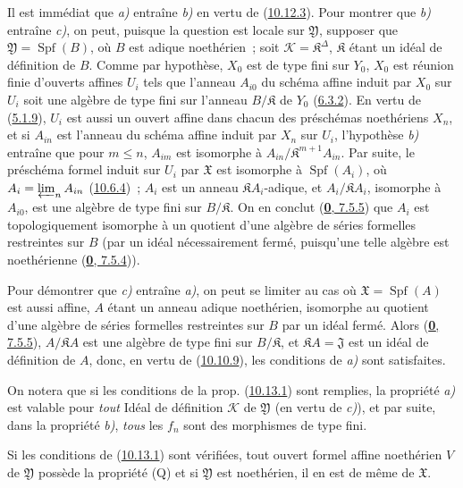Il est immédiat que \emph{a)} entraîne \emph{b)} en vertu de
(\hyperref[I.10.12.3-fr]{10.12.3}). Pour montrer que \emph{b)} entraîne \emph{c)}, on
peut, puisque la question est locale sur $\mathfrak{Y}$, supposer que
$\mathfrak{Y}=\operatorname{Spf}(B)$, où $B$ est adique noethérien~; soit
$\mathscr{K}=\mathfrak{K}^\Delta$, $\mathfrak{K}$ étant un idéal de
définition de $B$. Comme par hypothèse, $X_0$ est de type fini sur $Y_0$,
$X_0$ est réunion finie d'ouverts affines $U_i$ tels que l'anneau $A_{i0}$
du schéma affine induit par $X_0$ sur $U_i$ soit une algèbre de type fini sur
l'anneau $B/\mathfrak{K}$ de $Y_0$
(\hyperref[I.6.3.2-fr]{6.3.2}). En vertu de
(\hyperref[I.5.1.9-fr]{5.1.9}), $U_i$ est aussi un ouvert affine dans chacun
des préschémas noethériens $X_n$, et si $A_{in}$ est l'anneau du schéma
affine induit par $X_n$ sur $U_i$, l'hypothèse \emph{b)} entraîne que pour
$m\leq n$, $A_{im}$ est isomorphe à
$A_{in}/\mathfrak{K}^{m+1}A_{in}$. Par suite, le préschéma formel induit sur
$U_i$ par $\mathfrak{X}$ est isomorphe à $\operatorname{Spf}(A_i)$, où
$A_i=\varprojlim_n A_{in}$ (\hyperref[I.10.6.4-fr]{10.6.4})~; $A_i$ est un
anneau $\mathfrak{K}A_i$-adique, et $A_i/\mathfrak{K}A_i$, isomorphe à
$A_{i0}$, est une algèbre de type fini sur $B/\mathfrak{K}$. On en conclut
(\hyperref[0.7.5.5-fr]{\textbf{0}, 7.5.5}) que $A_i$ est topologiquement isomorphe à
un quotient d'une algèbre de séries formelles restreintes sur $B$ (par un
idéal nécessairement fermé, puisqu'une telle algèbre est noethérienne
(\hyperref[0.7.5.4-fr]{\textbf{0}, 7.5.4})).

Pour démontrer que \emph{c)} entraîne \emph{a)}, on peut se limiter au cas où
$\mathfrak{X}=\operatorname{Spf}(A)$ est aussi affine, $A$ étant un anneau
adique noethérien, isomorphe au quotient d'une algèbre de séries formelles
restreintes sur $B$ par un idéal fermé. Alors
(\hyperref[0.7.5.5-fr]{\textbf{0}, 7.5.5}), $A/\mathfrak{K}A$ est une algèbre de type
fini sur $B/\mathfrak{K}$, et $\mathfrak{K}A=\mathfrak{J}$ est un idéal de
définition de $A$, donc, en vertu de
(\hyperref[I.10.10.9-fr]{10.10.9}), les conditions de \emph{a)} sont satisfaites.

On notera que si les conditions de la prop.
(\hyperref[I.10.13.1-fr]{10.13.1}) sont remplies, la propriété \emph{a)} est
valable pour \emph{tout} Idéal de définition $\mathscr{K}$ de
$\mathfrak{Y}$ (en vertu de \emph{c)}), et par suite, dans la propriété \emph{b)},
\emph{tous} les $f_n$ sont des morphismes de type fini.

\begin{corollary}[10.13.2]
\label{I.10.13.2-fr}
Si les conditions de \textup{(\hyperref[I.10.13.1-fr]{10.13.1})} sont vérifiées,
tout ouvert formel affine noethérien $V$ de $\mathfrak{Y}$ possède la
propriété \textup{(Q)} et si $\mathfrak{Y}$ est noethérien, il en est de
même de $\mathfrak{X}$.
\end{corollary}

